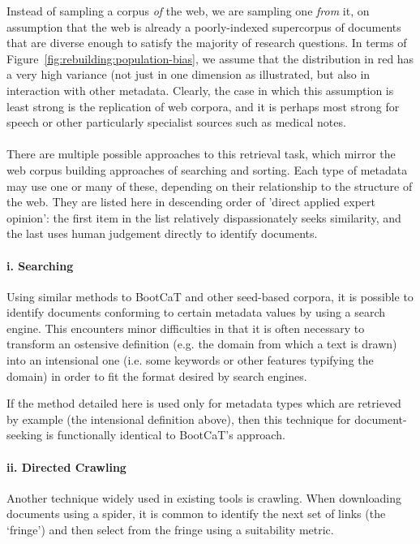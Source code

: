 Instead of sampling a corpus \textsl{of} the web, we are sampling one \textsl{from} it, on assumption that the web is already a poorly-indexed supercorpus of documents that are diverse enough to satisfy the majority of research questions.  In terms of Figure~\ref{fig:rebuilding:population-bias}, we assume that the distribution in red has a very high variance (not just in one dimension as illustrated, but also in interaction with other metadata.  Clearly, the case in which this assumption is least strong is the replication of web corpora, and it is perhaps most strong for speech or other particularly specialist sources such as medical notes.

\paragraph{}

There are multiple possible approaches to this retrieval task, which mirror the web corpus building approaches of searching and sorting.  Each type of metadata may use one or many of these, depending on their relationship to the structure of the web.  They are listed here in descending order of 'direct applied expert opinion': the first item in the list relatively dispassionately seeks similarity, and the last uses human judgement directly to identify documents.



\paragraph{i. Searching}
\label{sec:rebuilding:design:searching}
Using similar methods to BootCaT and other seed-based corpora, it is possible to identify documents conforming to certain metadata values by using a search engine.  This encounters minor difficulties in that it is often necessary to transform an ostensive definition (e.g. the domain from which a text is drawn) into an intensional one (i.e. some keywords or other features typifying the domain) in order to fit the format desired by search engines.

If the method detailed here is used only for metadata types which are retrieved by example (the intensional definition above), then this technique for document-seeking is functionally identical to BootCaT's approach.



\paragraph{ii. Directed Crawling}
Another technique widely used in existing tools is crawling.  When downloading documents using a spider, it is common to identify the next set of links (the `fringe') and then select from the fringe using a suitability metric.

